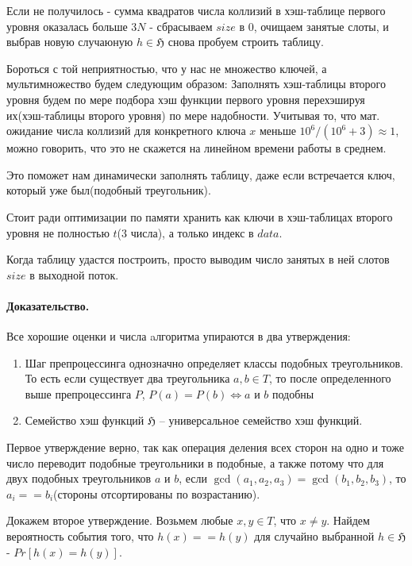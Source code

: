 \documentclass[12pt]{article}
\begin{document}
Если не получилось - сумма квадратов числа коллизий в хэш-таблице первого
уровня оказалась больше $ 3N $ - сбрасываем $ size $ в 0, очищаем занятые слоты,
и выбрав новую случаюную $ h \in \mathfrak{H} $ снова пробуем строить таблицу.

Бороться с той неприятностью, что у нас не множество ключей, а мультимножество
будем следующим образом: Заполнять хэш-таблицы второго уровня будем по мере
подбора хэш функции первого уровня перехэшируя их(хэш-таблицы второго уровня)
по мере надобности.  Учитывая то, что мат. ожидание числа коллизий
для конкретного ключа $ x $ меньше $ 10^6 / (10^6 + 3) \approx 1$,
можно говорить, что это не скажется на линейном времени работы в среднем.

Это поможет нам динамически заполнять таблицу, даже если встречается ключ,
который уже был(подобный треугольник).

Стоит ради оптимизации по памяти хранить как ключи в хэш-таблицах
второго уровня не полностью $ t $(3 числа), а только индекс в $ data $.

Когда таблицу удастся построить, просто выводим число занятых в ней слотов
$ size $ в выходной поток.

\paragraph{Доказательство.}
Все хорошие оценки и числа aлгоритма упираются в два утверждения:
\begin{enumerate}
    \item Шаг препроцессинга однозначно определяет классы
          подобных треугольников. То есть если существует два
          треугольника $ a, b \in T $, то после определенного выше
          препроцессинга
          $ P $, $ P(a) = P(b) \Leftrightarrow a \mbox{ и } b \mbox{ подобны} $

    \item Семейство хэш функций $ \mathfrak{H} $ -- универсальное семейство
          хэш функций.
\end{enumerate}

Первое утверждение верно, так как операция деления всех сторон на одно и
тоже число переводит подобные треугольники в подобные, а также потому что
для двух подобных треугольников $ a $ и $ b $, если $ \gcd(a_1, a_2, a_3) =
\gcd(b_1, b_2, b_3) $, то $ a_i == b_i $(стороны отсортированы по возрастанию).

Докажем второе утверждение. Возьмем любые $ x, y \in T $, что $ x \ne y $.
Найдем вероятность события того, что $ h(x) == h(y) $ для случайно
выбранной $ h \in \mathfrak{H} $ - $ Pr[h(x) = h(y)] $.
\end{document}
